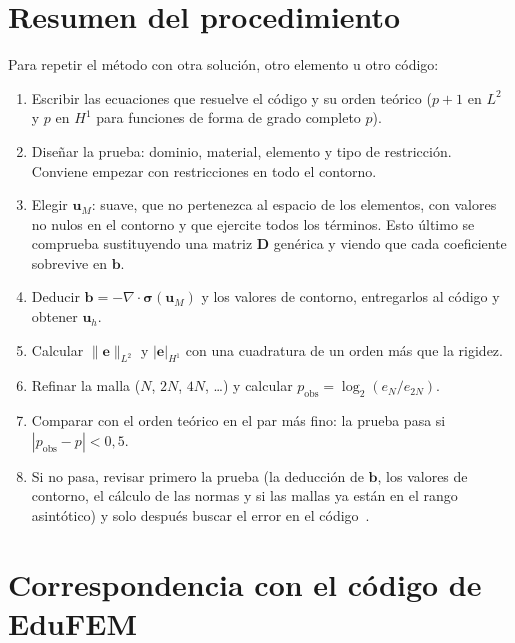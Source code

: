 \documentclass[11pt,a4paper]{article}
\newcommand{\uM}{\bm{u}_M}
\newcommand{\eh}{\bm{e}}
\begin{document}
\section{Resumen del procedimiento}\label{sec:resumen}

Para repetir el método con otra solución, otro elemento u otro código:

\begin{enumerate}[leftmargin=1.6em]
  \item Escribir las ecuaciones que resuelve el código y su orden teórico ($p+1$ en $L^2$ y $p$ en
    $H^1$ para funciones de forma de grado completo $p$).
  \item Diseñar la prueba: dominio, material, elemento y tipo de restricción. Conviene empezar con
    restricciones en todo el contorno.
  \item Elegir $\uM$: suave, que no pertenezca al espacio de los elementos, con valores no nulos en
    el contorno y que ejercite todos los términos. Esto último se comprueba sustituyendo una matriz
    $\bm D$ genérica y viendo que cada coeficiente sobrevive en $\bm b$.
  \item Deducir $\bm b = -\nabla\cdot\bm\sigma(\uM)$ y los valores de contorno, entregarlos al código
    y obtener $\bm u_h$.
  \item Calcular $\|\eh\|_{L^2}$ y $|\eh|_{H^1}$ con una cuadratura de un orden más que la rigidez.
  \item Refinar la malla ($N$, $2N$, $4N$, \dots) y calcular $p_{\text{obs}} = \log_2(e_N/e_{2N})$.
  \item Comparar con el orden teórico en el par más fino: la prueba pasa si
    $|p_{\text{obs}} - p| < 0,5$.
  \item Si no pasa, revisar primero la prueba (la deducción de $\bm b$, los valores de contorno, el
    cálculo de las normas y si las mallas ya están en el rango asintótico) y solo después buscar el
    error en el código~\cite[pp.~33--35]{salari}.
\end{enumerate}

\appendix
\section{Correspondencia con el código de EduFEM}\label{anx:codigo}
\end{document}
